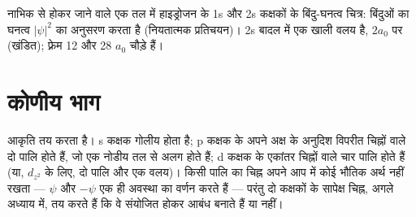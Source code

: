 \begin{omfigure}
\hspace{0.12\linewidth}%

{\small नाभिक से होकर जाने वाले एक तल में हाइड्रोजन के 1s और 2s कक्षकों के बिंदु-घनत्व
चित्र: बिंदुओं का घनत्व $|\psi|^2$ का अनुसरण करता है (नियतात्मक
प्रतिचयन)। 2s बादल में एक खाली वलय है, $2a_0$ पर  (खंडित);
फ़्रेम 12 और 28 $a_0$ चौड़े हैं।}
\end{omfigure}

\section{कोणीय भाग}

 आकृति तय करता है। s कक्षक गोलीय होता है; p कक्षक के अपने अक्ष के अनुदिश
विपरीत चिह्नों वाले दो पालि होते हैं, जो एक नोडीय तल से अलग होते हैं; d कक्षक के
एकांतर चिह्नों वाले चार पालि होते हैं (या, $d_{z^2}$ के लिए, दो पालि और एक वलय)। किसी पालि
का चिह्न अपने आप में कोई भौतिक अर्थ नहीं रखता --- $\psi$ और $-\psi$ एक ही
अवस्था का वर्णन करते हैं --- परंतु दो कक्षकों के सापेक्ष चिह्न, अगले अध्याय में, तय करते हैं
कि वे संयोजित होकर आबंध बनाते हैं या नहीं।

